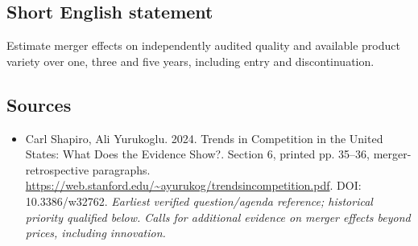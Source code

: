 \documentclass[11pt]{article}
\begin{document}
\subsection{Short English statement}
Estimate merger effects on independently audited quality and available product variety over one, three and five years, including entry and discontinuation.

\subsection{Sources}
\begin{itemize}\raggedright
\item[\textnormal{[S1]}]\hypertarget{source:30007675:1}{} Carl Shapiro, Ali Yurukoglu. 2024. Trends in Competition in the United States: What Does the Evidence Show?. Section 6, printed pp. 35–36, merger-retrospective paragraphs.
\url{https://web.stanford.edu/~ayurukog/trendsincompetition.pdf}.
DOI: 10.3386/w32762.
{\small\textit{Earliest verified question/agenda reference; historical priority qualified below. Calls for additional evidence on merger effects beyond prices, including innovation.}}
\end{itemize}
\end{document}
